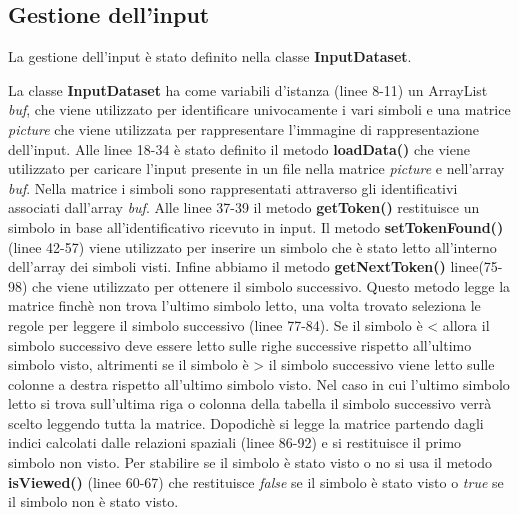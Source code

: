 \subsection{Gestione dell'input}
La gestione dell'input è stato definito nella classe \textbf{InputDataset}.

La classe \textbf{InputDataset} ha come variabili d'istanza (linee 8-11) un ArrayList \textit{buf}, che viene utilizzato per identificare univocamente i vari simboli e una matrice \textit{picture} che viene utilizzata per rappresentare l'immagine di rappresentazione dell'input. Alle linee 18-34 è stato definito il metodo \textbf{loadData()} che viene utilizzato per caricare l'input presente in un file nella matrice \textit{picture} e nell'array \textit{buf}. Nella matrice i simboli sono rappresentati attraverso gli identificativi associati dall'array \textit{buf}. Alle linee 37-39 il metodo \textbf{getToken()} restituisce un simbolo in base all'identificativo ricevuto in input. Il metodo \textbf{setTokenFound()} (linee 42-57) viene utilizzato per inserire un simbolo che è stato letto all'interno dell'array dei simboli visti. Infine abbiamo il metodo \textbf{getNextToken()} linee(75-98) che viene utilizzato per ottenere il simbolo successivo. Questo metodo legge la matrice finchè non trova l'ultimo simbolo letto, una volta trovato seleziona le regole per leggere il simbolo successivo (linee 77-84). Se il simbolo è < allora il simbolo successivo deve essere letto sulle righe successive rispetto all'ultimo simbolo visto, altrimenti se il simbolo è > il simbolo successivo viene letto sulle colonne a destra rispetto all'ultimo simbolo visto. Nel caso in cui l'ultimo simbolo letto si trova sull'ultima riga o colonna della tabella il simbolo successivo verrà scelto leggendo tutta la matrice. Dopodichè si legge la matrice partendo dagli indici calcolati dalle relazioni spaziali (linee 86-92) e si restituisce il primo simbolo non visto. Per stabilire se il simbolo è stato visto o no si usa il metodo \textbf{isViewed()} (linee 60-67) che restituisce \textit{false} se il simbolo è stato visto o \textit{true} se il simbolo non è stato visto.
